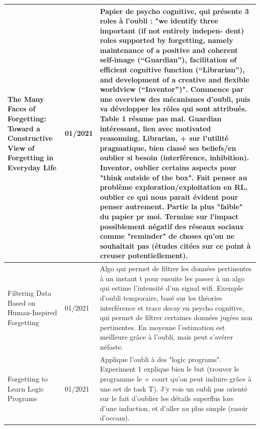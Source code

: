 \documentclass[french]{article}
\begin{document}
    \begin{table}[ht!]
        \begin{center}
        \begin{tabular}{|p{}|p{}|p{}|}

            \hline

            The Many Faces of Forgetting: Toward a Constructive View of Forgetting in Everyday Life \cite{fawcett_many_2020}
            & 01/2021
            & Papier de psycho cognitive, qui présente 3 roles à l'oubli : "we identify three important (if not entirely indepen-
            dent) roles supported by forgetting, namely maintenance of a positive and coherent self-image (“Guardian”),
            facilitation of efficient cognitive function (“Librarian”), and development of a creative and flexible worldview
            (“Inventor”)". Commence par une overview des mécanismes d'oubli, puis va développer les rôles qui sont attribués. Table 1 résume pas mal.
            Guardian intéressant, lien avec motivated reasonning. Librarian, + sur l'utilité pragmatique, bien classé ses beliefs/en oublier si besoin (interférence, inhibition). Inventor, oublier certains aspects pour "think outside of the box". Fait penser au problème exploration/exploitation en RL, oublier ce qui nous parait évident pour penser autrement. Partie la plus "faible" du papier pr moi. Termine sur l'impact possiblement négatif des réseaux sociaux comme "reminder" de choses qu'on ne souhaitait pas (études citées sur ce point à creuser potentiellement).
            \\
            \hline

            Filtering Data Based on Human-Inspired Forgetting \cite{freedman_filtering_2011}
            & 01/2021
            & Algo qui permet de filtrer les données pertinentes à un instant t pour ensuite les passer à un algo qui estime l'intensité d'un signal wifi. Exemple d'oubli temporaire, basé sur les théories interférence et trace decay en psycho cognitive, qui permet de filtrer certaines données jugées non pertinentes. En moyenne l'estimation est meilleure grâce à l'oubli, mais peut s'avérer néfaste.
            \\
            \hline

            Forgetting to Learn Logic Programs \cite{cropper_forgetting_2020}
            & 01/2021
            & Applique l'oubli à des "logic programs". Experiment 1 explique bien le but (trouver le programme le + court qu'on peut induire grâce à une set de task T). J'y vois un oubli pus orienté sur le fait d'oublier les détails superflus lors d'une induction, et d'aller au plus simple (rasoir d'occam).


\end{tabular}
\end{center}
\end{table}
\end{document}
